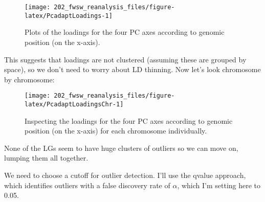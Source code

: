 \documentclass[11pt,]{article}
\newenvironment{Shaded}{\begin{snugshade}}{\end{snugshade}}
\newcommand{\KeywordTok}[1]{\textcolor[rgb]{0.13,0.29,0.53}{\textbf{#1}}}
\newcommand{\DataTypeTok}[1]{\textcolor[rgb]{0.13,0.29,0.53}{#1}}
\newcommand{\DecValTok}[1]{\textcolor[rgb]{0.00,0.00,0.81}{#1}}
\newcommand{\FloatTok}[1]{\textcolor[rgb]{0.00,0.00,0.81}{#1}}
\newcommand{\StringTok}[1]{\textcolor[rgb]{0.31,0.60,0.02}{#1}}
\newcommand{\OtherTok}[1]{\textcolor[rgb]{0.56,0.35,0.01}{#1}}
\newcommand{\ControlFlowTok}[1]{\textcolor[rgb]{0.13,0.29,0.53}{\textbf{#1}}}
\newcommand{\OperatorTok}[1]{\textcolor[rgb]{0.81,0.36,0.00}{\textbf{#1}}}
\newcommand{\NormalTok}[1]{#1}
\begin{document}
\begin{figure}[H]
\texttt{[image: 202\_fwsw\_reanalysis\_files/figure-latex/PcadaptLoadings-1]} \caption{Plots of the loadings for the four PC axes according to genomic position (on the x-axis).}\label{fig:PcadaptLoadings}
\end{figure}

This suggests that loadings are not clustered (assuming these are
grouped by space), so we don't need to worry about LD thinning. Now
let's look chromosome by chromosome:

\begin{Shaded}
\end{Shaded}

\begin{figure}[H]
\texttt{[image: 202\_fwsw\_reanalysis\_files/figure-latex/PcadaptLoadingsChr-1]} \caption{Inspecting the loadings for the four PC axes according to genomic position (on the x-axis) for each chromosome individually.}\label{fig:PcadaptLoadingsChr}
\end{figure}

None of the LGs seem to have huge clusters of outliers so we can move
on, lumping them all together.

We need to choose a cutoff for outlier detection. I'll use the qvalue
approach, which identifies outliers with a false discovery rate of
\(\alpha\), which I'm setting here to 0.05.
\end{document}
